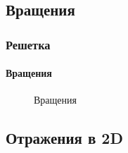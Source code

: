 \subsection{Вращения}


\begin{frame}
    \frametitle{Решетка}
    \framesubtitle{Вращения}
    \begin{figure}
        \begin{center}
            \caption{Вращения}\label{pict:rotation}
        \end{center}
    \end{figure} 
\end{frame}


\subsection{Отражения в 2D}


